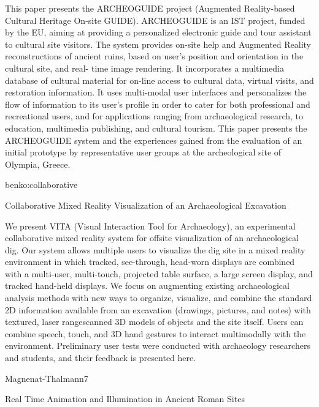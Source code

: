 This paper presents the ARCHEOGUIDE project
(Augmented Reality-based Cultural Heritage On-site
GUIDE). ARCHEOGUIDE is an IST project, funded by
the EU, aiming at providing a personalized electronic
guide and tour assistant to cultural site visitors. The
system provides on-site help and Augmented Reality
reconstructions of ancient ruins, based on user’s
position and orientation in the cultural site, and real-
time image rendering. It incorporates a multimedia
database of cultural material for on-line access to
cultural data, virtual visits, and restoration information.
It uses multi-modal user interfaces and personalizes the
flow of information to its user’s profile in order to cater
for both professional and recreational users, and for
applications ranging from archaeological research, to
education, multimedia publishing, and cultural tourism.
This paper presents the ARCHEOGUIDE system and
the experiences gained from the evaluation of an initial
prototype by representative user groups at the
archeological site of Olympia, Greece.


benko:collaborative

Collaborative Mixed Reality Visualization of an Archaeological Excavation

We present VITA (Visual Interaction Tool for Archaeology),
an experimental collaborative mixed reality system
for offsite visualization of an archaeological dig. Our
system allows multiple users to visualize the dig site in a
mixed reality environment in which tracked, see-through,
head-worn displays are combined with a multi-user,
multi-touch, projected table surface, a large screen display,
and tracked hand-held displays. We focus on augmenting
existing archaeological analysis methods with
new ways to organize, visualize, and combine the standard
2D information available from an excavation (drawings,
pictures, and notes) with textured, laser rangescanned
3D models of objects and the site itself. Users
can combine speech, touch, and 3D hand gestures to interact
multimodally with the environment. Preliminary
user tests were conducted with archaeology researchers
and students, and their feedback is presented here. 


Magnenat-Thalmann7

Real Time Animation and Illumination in Ancient Roman Sites

